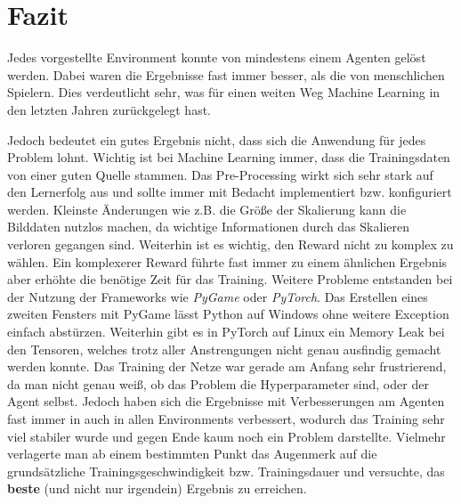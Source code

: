 \documentclass[12pt,a4paper]{article}
\begin{document}
\newpage

\section{Fazit}
Jedes vorgestellte Environment konnte von mindestens einem Agenten gelöst werden.
Dabei waren die Ergebnisse fast immer besser, als die von menschlichen Spielern.
Dies verdeutlicht sehr, was für einen weiten Weg Machine Learning in den letzten Jahren zurückgelegt hast.

Jedoch bedeutet ein gutes Ergebnis nicht, dass sich die Anwendung für jedes Problem lohnt.
Wichtig ist bei Machine Learning immer, dass die Trainingsdaten von einer guten Quelle stammen.
Das Pre-Processing wirkt sich sehr stark auf den Lernerfolg aus und sollte immer mit Bedacht implementiert bzw. konfiguriert werden.
Kleinste Änderungen wie z.B. die Größe der Skalierung kann die Bilddaten nutzlos machen, da wichtige Informationen durch das Skalieren verloren gegangen sind.
Weiterhin ist es wichtig, den Reward nicht zu komplex zu wählen.
Ein komplexerer Reward führte fast immer zu einem ähnlichen Ergebnis aber erhöhte die benötige Zeit für das Training.
Weitere Probleme entstanden bei der Nutzung der Frameworks wie \textit{PyGame} oder \textit{PyTorch}.
Das Erstellen eines zweiten Fensters mit PyGame lässt Python auf Windows ohne weitere Exception einfach abstürzen.
Weiterhin gibt es in PyTorch auf Linux ein Memory Leak bei den Tensoren, welches trotz aller Anstrengungen nicht genau ausfindig gemacht werden konnte.
Das Training der Netze war gerade am Anfang sehr frustrierend, da man nicht genau weiß, ob das Problem die Hyperparameter sind, oder der Agent selbst.
Jedoch haben sich die Ergebnisse mit Verbesserungen am Agenten fast immer in auch in allen Environments verbessert, wodurch das Training sehr viel stabiler wurde und gegen Ende kaum noch ein Problem darstellte.
Vielmehr verlagerte man ab einem bestimmten Punkt das Augenmerk auf die grundsätzliche Trainingsgeschwindigkeit bzw. Trainingsdauer und versuchte, das \textbf{beste} (und nicht nur irgendein) Ergebnis zu erreichen.
\end{document}
